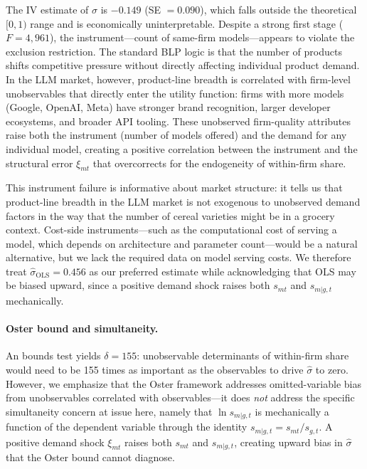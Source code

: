 \documentclass[11pt, a4paper]{article}
\begin{document}
The IV estimate of $\sigma$ is $-0.149$ (SE $= 0.090$), which falls outside the theoretical $[0, 1)$ range and is economically uninterpretable. Despite a strong first stage ($F = 4{,}961$), the instrument---count of same-firm models---appears to violate the exclusion restriction. The standard BLP logic is that the number of products shifts competitive pressure without directly affecting individual product demand. In the LLM market, however, product-line breadth is correlated with firm-level unobservables that directly enter the utility function: firms with more models (Google, OpenAI, Meta) have stronger brand recognition, larger developer ecosystems, and broader API tooling. These unobserved firm-quality attributes raise both the instrument (number of models offered) and the demand for any individual model, creating a positive correlation between the instrument and the structural error $\xi_{mt}$ that overcorrects for the endogeneity of within-firm share.

This instrument failure is informative about market structure: it tells us that product-line breadth in the LLM market is not exogenous to unobserved demand factors in the way that the number of cereal varieties might be in a grocery context. Cost-side instruments---such as the computational cost of serving a model, which depends on architecture and parameter count---would be a natural alternative, but we lack the required data on model serving costs. We therefore treat $\hat{\sigma}_{\text{OLS}} = 0.456$ as our preferred estimate while acknowledging that OLS may be biased upward, since a positive demand shock raises both $s_{mt}$ and $s_{m|g,t}$ mechanically.

\paragraph{Oster bound and simultaneity.} An \citet{oster2019unobservable} bounds test yields $\delta = 155$: unobservable determinants of within-firm share would need to be 155 times as important as the observables to drive $\hat{\sigma}$ to zero. However, we emphasize that the Oster framework addresses omitted-variable bias from unobservables correlated with observables---it does \emph{not} address the specific simultaneity concern at issue here, namely that $\ln s_{m|g,t}$ is mechanically a function of the dependent variable through the identity $s_{m|g,t} = s_{mt}/s_{g,t}$. A positive demand shock $\xi_{mt}$ raises both $s_{mt}$ and $s_{m|g,t}$, creating upward bias in $\hat{\sigma}$ that the Oster bound cannot diagnose.
\end{document}
